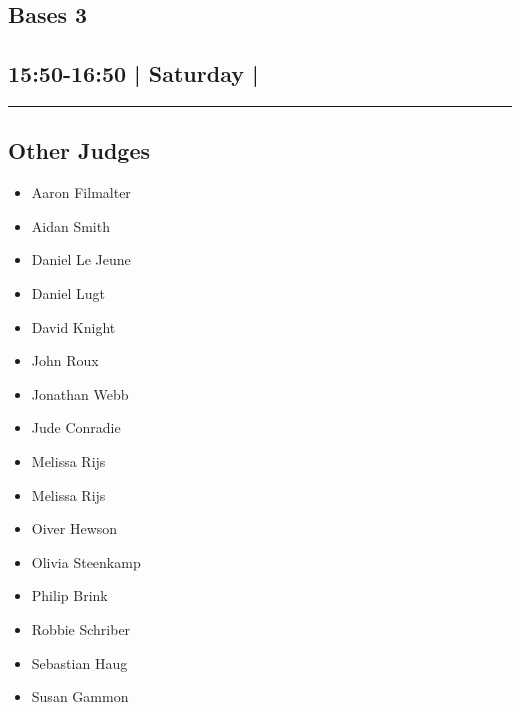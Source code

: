 \documentclass[10pt, A5]{article}
\begin{document}
		\begin{framed}
			\begin{minipage}{\textwidth}

			\setcounter{section}{54}
							\section{Bases 3}
						
			\subsection*{15:50-16:50 | Saturday | }

			\vspace{0.25cm}
			\hrule
			\vspace{0.25cm}


			\subsection*{Other Judges}
							

				\begin{multicols}{2}

			\begin{itemize}
											\item Aaron Filmalter
											\item Aidan Smith
											\item Daniel Le Jeune
											\item Daniel Lugt
											\item David Knight
											\item John Roux
											\item Jonathan Webb
											\item Jude Conradie
											\item Melissa Rijs
								\end{itemize}

			\vfill\null
			\columnbreak

			\begin{itemize}
											\item Melissa Rijs
											\item Oiver Hewson
											\item Olivia Steenkamp
											\item Philip Brink
											\item Robbie Schriber
											\item Sebastian Haug
											\item Susan Gammon
								\end{itemize}


\end{multicols}
\end{minipage}
\end{framed}
\end{document}
